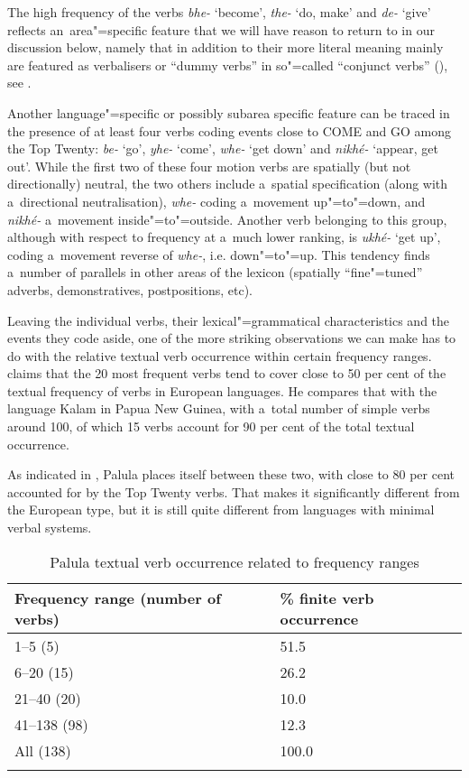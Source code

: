 The high frequency of the verbs \textit{bhe-} `become', \textit{the-} `do, make' and \textit{de-} `give' reflects an~area"=specific feature that we will have reason to return to in our discussion below, namely that in addition to their more literal meaning mainly are featured as verbalisers \citep[368]{masica1991} or ``dummy verbs'' in so"=called ``conjunct verbs'' (\citeyear[326]{masica1991}), see . 



Another language"=specific or possibly subarea specific feature can be traced in the presence of at least four verbs coding events close to COME and GO among the Top Twenty: \textit{be-} `go', \textit{yhe-} `come', \textit{whe-} `get down' and \textit{nikhé-} `appear, get out'. While the first two of these four motion verbs are spatially (but not directionally) neutral, the two others include a~spatial specification (along with a~directional neutralisation), \textit{whe-} coding a~movement up"=to"=down, and \textit{nikhé-} a~movement inside"=to"=outside. Another verb belonging to this group, although with respect to frequency at a~much lower ranking, is \textit{ukhé-} `get up', coding a~movement reverse of \textit{whe-}, i.e. down"=to"=up. This tendency finds a~number of parallels in other areas of the lexicon (spatially ``fine"=tuned'' adverbs, demonstratives, postpositions, etc).



Leaving the individual verbs, their lexical"=grammatical characteristics and the events they code aside, one of the more striking observations we can make has to do with the relative textual verb occurrence within certain frequency ranges. \citet[409]{viberg2006} claims that the 20 most frequent verbs tend to cover close to 50 per cent of the textual frequency of verbs in European languages. He compares that with the language Kalam in Papua New Guinea, with a~total number of simple verbs around 100, of which 15 verbs account for 90 per cent of the total textual occurrence. 



As indicated in , Palula places itself between these two, with close to 80 per cent accounted for by the Top Twenty verbs. That makes it significantly different from the European type, but it is still quite different from languages with minimal verbal systems. 


\begin{table}[ht]
\caption{Palula textual verb occurrence related to frequency ranges}

\begin{tabularx}{\textwidth}{ Q P{50mm} }
\lsptoprule
Frequency range (number of verbs) &
\% finite verb occurrence\\--5 (5) &
\phantom{1}51.5\\
6--20 (15) &
\phantom{1}26.2\\
21--40 (20) &
\phantom{1}10.0\\
41--138 (98) &
\phantom{1}12.3\\
All (138) &
100.0\\\lspbottomrule
\end{tabularx}
\label{tab:8-2}
\end{table}


